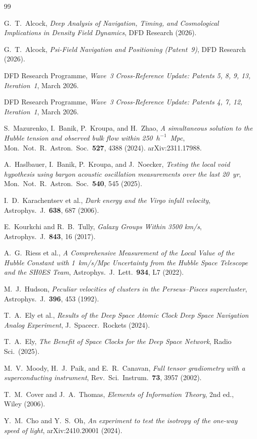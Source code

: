 \documentclass[aps,prd,twocolumn,superscriptaddress,nofootinbib,longbibliography]{revtex4-2}
\begin{document}
\begin{thebibliography}{99}

G.~T.~Alcock,
\textit{Deep Analysis of Navigation, Timing, and Cosmological
Implications in Density Field Dynamics},
DFD Research (2026).

G.~T.~Alcock,
\textit{Psi-Field Navigation and Positioning (Patent~9)},
DFD Research (2026).

DFD Research Programme,
\textit{Wave~3 Cross-Reference Update: Patents 5, 8, 9, 13, Iteration~1},
March 2026.

DFD Research Programme,
\textit{Wave~3 Cross-Reference Update: Patents 4, 7, 12, Iteration~1},
March 2026.

S.~Mazurenko, I.~Banik, P.~Kroupa, and H.~Zhao,
\textit{A simultaneous solution to the Hubble tension and observed
bulk flow within 250~$h^{-1}$~Mpc},
Mon.\ Not.\ R.\ Astron.\ Soc.\ \textbf{527}, 4388 (2024).
arXiv:2311.17988.

A.~Haslbauer, I.~Banik, P.~Kroupa, and J.~Noecker,
\textit{Testing the local void hypothesis using baryon acoustic
oscillation measurements over the last 20~yr},
Mon.\ Not.\ R.\ Astron.\ Soc.\ \textbf{540}, 545 (2025).

I.~D.~Karachentsev et al.,
\textit{Dark energy and the Virgo infall velocity},
Astrophys.\ J.\ \textbf{638}, 687 (2006).

E.~Kourkchi and R.~B.~Tully,
\textit{Galaxy Groups Within 3500 km/s},
Astrophys.\ J.\ \textbf{843}, 16 (2017).

A.~G.~Riess et al.,
\textit{A Comprehensive Measurement of the Local Value of the Hubble
Constant with 1~km/s/Mpc Uncertainty from the Hubble Space Telescope
and the SH0ES Team},
Astrophys.\ J.\ Lett.\ \textbf{934}, L7 (2022).

M.~J.~Hudson,
\textit{Peculiar velocities of clusters in the Perseus--Pisces supercluster},
Astrophys.\ J.\ \textbf{396}, 453 (1992).

T.~A.~Ely et al.,
\textit{Results of the Deep Space Atomic Clock Deep Space Navigation
Analog Experiment},
J.\ Spacecr.\ Rockets (2024).

T.~A.~Ely,
\textit{The Benefit of Space Clocks for the Deep Space Network},
Radio Sci.\ (2025).

M.~V.~Moody, H.~J.~Paik, and E.~R.~Canavan,
\textit{Full tensor gradiometry with a superconducting instrument},
Rev.\ Sci.\ Instrum.\ \textbf{73}, 3957 (2002).

T.~M.~Cover and J.~A.~Thomas,
\textit{Elements of Information Theory}, 2nd ed.,
Wiley (2006).

Y.~M.~Cho and Y.~S.~Oh,
\textit{An experiment to test the isotropy of the one-way speed of light},
arXiv:2410.20001 (2024).

\end{thebibliography}
\end{document}
